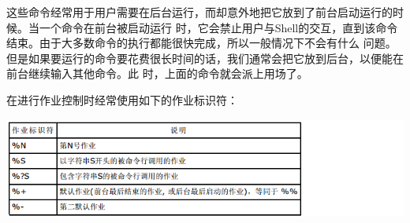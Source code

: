 \documentclass[letterpaper,10pt]{sphinxmanual}
\begin{document}
这些命令经常用于用户需要在后台运行，而却意外地把它放到了前台启动运行的时候。当一个命令在前台被启动运行
时，它会禁止用户与Shell的交互，直到该命令结束。由于大多数命令的执行都能很快完成，所以一般情况下不会有什么
问题。但是如果要运行的命令要花费很长时间的话，我们通常会把它放到后台，以便能在前台继续输入其他命令。此
时，上面的命令就会派上用场了。

在进行作业控制时经常使用如下的作业标识符：

\includegraphics{job2.png}
\end{document}
